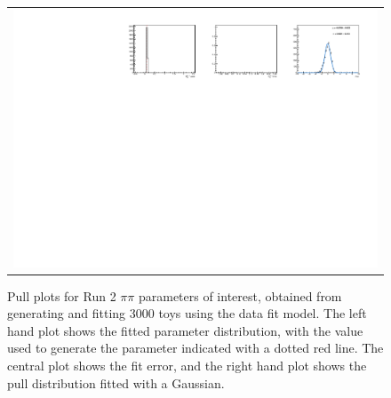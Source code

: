 \begin{figure}
\begin{tabular}{c}
\includegraphics[width=\textwidth]{ANA_resources/Plots/Data_fit/FitterBias//R_ds_pipi_run2.pdf} \\
  \end{tabular}
  \caption{Pull plots for Run 2 $\pi\pi$ parameters of interest, obtained from generating and fitting 3000 toys using the data fit model. The left hand plot shows the fitted parameter distribution, with the value used to generate the parameter indicated with a dotted red line. The central plot shows the fit error, and the right hand plot shows the pull distribution fitted with a Gaussian.}
\label{fig:pipi_run2_pulls}
\end{figure}
